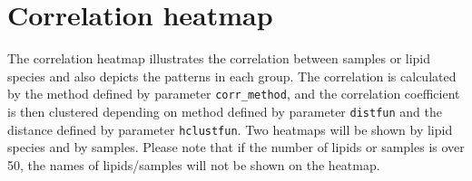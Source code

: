 \documentclass[]{article}
\begin{document}
\hypertarget{correlation-heatmap}{%
\section{Correlation heatmap}\label{correlation-heatmap}}

The correlation heatmap illustrates the correlation between samples or lipid species and also depicts the patterns in each group. The correlation is calculated by the method defined by parameter \texttt{corr\_method}, and the correlation coefficient is then clustered depending on method defined by parameter \texttt{distfun} and the distance defined by parameter \texttt{hclustfun}. Two heatmaps will be shown by lipid species and by samples. Please note that if the number of lipids or samples is over 50, the names of lipids/samples will not be shown on the heatmap.
\end{document}
